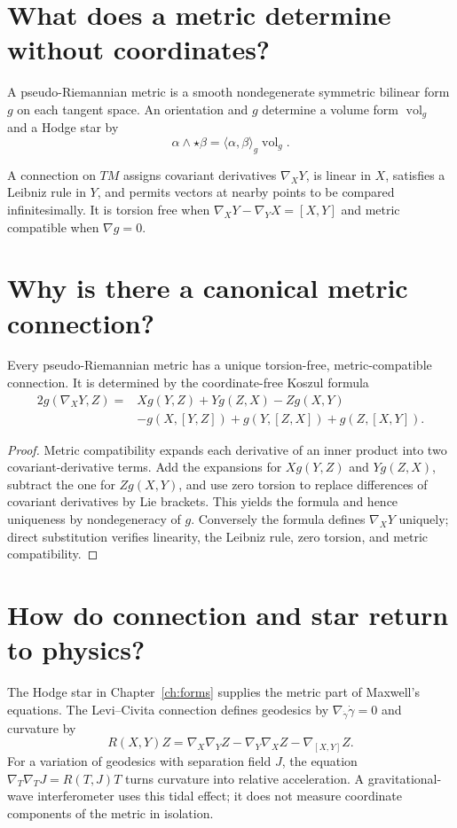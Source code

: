 \section{What does a metric determine without coordinates?}

A pseudo-Riemannian metric is a smooth nondegenerate symmetric bilinear form
$g$ on each tangent space.  An orientation and $g$ determine a volume form
$\operatorname{vol}_g$ and a Hodge star by
\[
\alpha\wedge\star\beta
=\langle\alpha,\beta\rangle_g\operatorname{vol}_g.
\]

A connection on $TM$ assigns covariant derivatives $\nabla_XY$, is linear in
$X$, satisfies a Leibniz rule in $Y$, and permits vectors at nearby points to
be compared infinitesimally.  It is torsion free when
$\nabla_XY-\nabla_YX=[X,Y]$ and metric compatible when $\nabla g=0$.

\section{Why is there a canonical metric connection?}

\begin{theorem}
Every pseudo-Riemannian metric has a unique torsion-free, metric-compatible
connection.  It is determined by the coordinate-free Koszul formula
\begin{align*}
2g(\nabla_XY,Z)={}&Xg(Y,Z)+Yg(Z,X)-Zg(X,Y)\\
&-g(X,[Y,Z])+g(Y,[Z,X])+g(Z,[X,Y]).
\end{align*}
\end{theorem}

\begin{proof}
Metric compatibility expands each derivative of an inner product into two
covariant-derivative terms.  Add the expansions for $Xg(Y,Z)$ and
$Yg(Z,X)$, subtract the one for $Zg(X,Y)$, and use zero torsion to replace
differences of covariant derivatives by Lie brackets.  This yields the
formula and hence uniqueness by nondegeneracy of $g$.  Conversely the formula
defines $\nabla_XY$ uniquely; direct substitution verifies linearity, the
Leibniz rule, zero torsion, and metric compatibility.
\end{proof}

\section{How do connection and star return to physics?}

The Hodge star in Chapter~\ref{ch:forms} supplies the metric part of Maxwell's
equations.  The Levi--Civita connection defines geodesics by
$\nabla_{\dot\gamma}\dot\gamma=0$ and curvature by
\[
R(X,Y)Z=\nabla_X\nabla_YZ-\nabla_Y\nabla_XZ-\nabla_{[X,Y]}Z.
\]
For a variation of geodesics with separation field $J$, the equation
$\nabla_T\nabla_TJ=R(T,J)T$ turns curvature into relative acceleration.  A
gravitational-wave interferometer uses this tidal effect; it does not measure
coordinate components of the metric in isolation.

